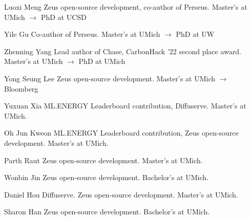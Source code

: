 

\begin{cvlist}

  \cvlistitem
    {Luoxi Meng}
    {Zeus open-source development, co-author of Perseus. Master's at UMich $\rightarrow$ PhD at UCSD}

  \cvlistitem
    {Yile Gu}
    {Co-author of Perseus. Master's at UMich $\rightarrow$ PhD at UW}

  \cvlistitem
    {Zhenning Yang}
    {Lead author of Chase, CarbonHack '22 second place award. Master's at UMich $\rightarrow$ PhD at UMich}

  \cvlistitem
    {Yong Seung Lee}
    {Zeus open-source development. Master's at UMich $\rightarrow$ Bloomberg}

  \cvlistitem
    {Yuxuan Xia}
    {ML.ENERGY Leaderboard contribution, Diffuserve. Master's at UMich.}

  \cvlistitem
    {Oh Jun Kweon}
    {ML.ENERGY Leaderboard contribution, Zeus open-source development. Master's at UMich.}

  \cvlistitem
    {Parth Raut}
    {Zeus open-source development. Master's at UMich.}

  \cvlistitem
    {Wonbin Jin}
    {Zeus open-source development. Bachelor's at UMich.}

  \cvlistitem
    {Daniel Hou}
    {Diffuserve. Zeus open-source development. Master's at UMich.}

  \cvlistitem
    {Sharon Han}
    {Zeus open-source development. Bachelor's at UMich.}

\end{cvlist}
